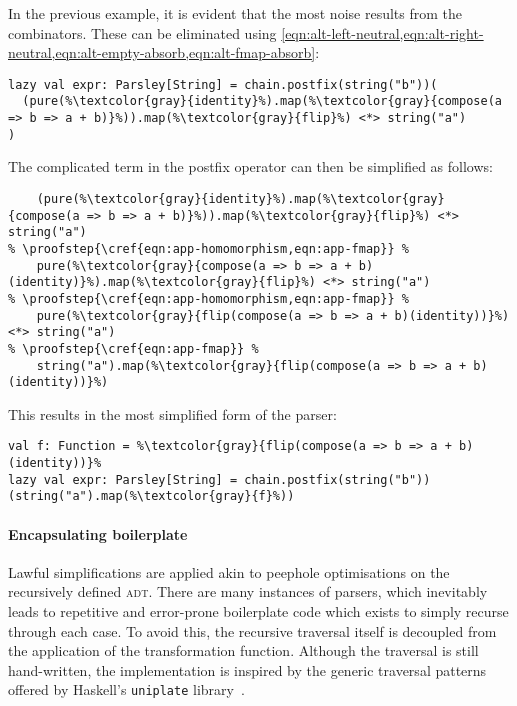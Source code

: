\documentclass[../../main.tex]{subfiles}
\begin{document}
In the previous example, it is evident that the most noise results from the  combinators.
These can be eliminated using \cref{eqn:alt-left-neutral,eqn:alt-right-neutral,eqn:alt-empty-absorb,eqn:alt-fmap-absorb}:
\begin{verbatim}
lazy val expr: Parsley[String] = chain.postfix(string("b"))(
  (pure(%\textcolor{gray}{identity}%).map(%\textcolor{gray}{compose(a => b => a + b)}%)).map(%\textcolor{gray}{flip}%) <*> string("a")
)
\end{verbatim}
%
The complicated term in the postfix operator can then be simplified as follows:
\begin{verbatim}
    (pure(%\textcolor{gray}{identity}%).map(%\textcolor{gray}{compose(a => b => a + b)}%)).map(%\textcolor{gray}{flip}%) <*> string("a")
% \proofstep{\cref{eqn:app-homomorphism,eqn:app-fmap}} %
    pure(%\textcolor{gray}{compose(a => b => a + b)(identity)}%).map(%\textcolor{gray}{flip}%) <*> string("a")
% \proofstep{\cref{eqn:app-homomorphism,eqn:app-fmap}} %
    pure(%\textcolor{gray}{flip(compose(a => b => a + b)(identity))}%) <*> string("a")
% \proofstep{\cref{eqn:app-fmap}} %
    string("a").map(%\textcolor{gray}{flip(compose(a => b => a + b)(identity))}%)
\end{verbatim}
%
This results in the most simplified form of the parser:
\begin{verbatim}
val f: Function = %\textcolor{gray}{flip(compose(a => b => a + b)(identity))}%
lazy val expr: Parsley[String] = chain.postfix(string("b"))(string("a").map(%\textcolor{gray}{f}%))
\end{verbatim}

\paragraph{Encapsulating boilerplate}
Lawful simplifications are applied akin to peephole optimisations on the recursively defined  \textsc{adt}.
There are many instances of parsers, which inevitably leads to repetitive and error-prone boilerplate code which exists to simply recurse through each case.
To avoid this, the recursive traversal itself is decoupled from the application of the transformation function.
Although the traversal is still hand-written, the implementation is inspired by the generic traversal patterns offered by Haskell's \texttt{uniplate} library~\cite{mitchell_uniform_2007}.
\end{document}
